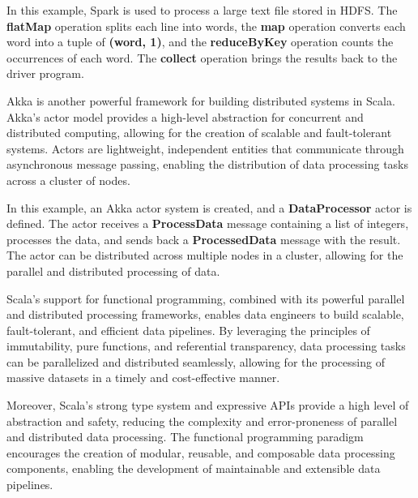 

In this example, Spark is used to process a large text file stored in HDFS. The \textbf{flatMap} operation splits each line into words, the \textbf{map} operation converts each word into a tuple of \textbf{(word, 1)}, and the \textbf{reduceByKey} operation counts the occurrences of each word. The \textbf{collect} operation brings the results back to the driver program.

Akka is another powerful framework for building distributed systems in Scala. Akka's actor model provides a high-level abstraction for concurrent and distributed computing, allowing for the creation of scalable and fault-tolerant systems. Actors are lightweight, independent entities that communicate through asynchronous message passing, enabling the distribution of data processing tasks across a cluster of nodes.



In this example, an Akka actor system is created, and a \textbf{DataProcessor} actor is defined. The actor receives a \textbf{ProcessData} message containing a list of integers, processes the data, and sends back a \textbf{ProcessedData} message with the result. The actor can be distributed across multiple nodes in a cluster, allowing for the parallel and distributed processing of data.

Scala's support for functional programming, combined with its powerful parallel and distributed processing frameworks, enables data engineers to build scalable, fault-tolerant, and efficient data pipelines. By leveraging the principles of immutability, pure functions, and referential transparency, data processing tasks can be parallelized and distributed seamlessly, allowing for the processing of massive datasets in a timely and cost-effective manner.

Moreover, Scala's strong type system and expressive APIs provide a high level of abstraction and safety, reducing the complexity and error-proneness of parallel and distributed data processing. The functional programming paradigm encourages the creation of modular, reusable, and composable data processing components, enabling the development of maintainable and extensible data pipelines.